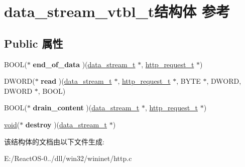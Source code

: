 \hypertarget{structdata__stream__vtbl__t}{}\section{data\+\_\+stream\+\_\+vtbl\+\_\+t结构体 参考}
\label{structdata__stream__vtbl__t}
\subsection*{Public 属性}
\begin{DoxyCompactItemize}
\item 
\mbox{\label{structdata__stream__vtbl__t_a87714ca484e6c808b1e661619e27b19b}} 
B\+O\+OL($\ast$ {\bfseries end\+\_\+of\+\_\+data} )(\hyperlink{structdata__stream__t}{data\+\_\+stream\+\_\+t} $\ast$, \hyperlink{structhttp__request__t}{http\+\_\+request\+\_\+t} $\ast$)
\item 
\mbox{\label{structdata__stream__vtbl__t_ac872be90e519d753513e3fe281972f1a}} 
D\+W\+O\+RD($\ast$ {\bfseries read} )(\hyperlink{structdata__stream__t}{data\+\_\+stream\+\_\+t} $\ast$, \hyperlink{structhttp__request__t}{http\+\_\+request\+\_\+t} $\ast$, B\+Y\+TE $\ast$, D\+W\+O\+RD, D\+W\+O\+RD $\ast$, B\+O\+OL)
\item 
\mbox{\label{structdata__stream__vtbl__t_a8a997f4f5ac2e257aa4a939e4c81aea8}} 
B\+O\+OL($\ast$ {\bfseries drain\+\_\+content} )(\hyperlink{structdata__stream__t}{data\+\_\+stream\+\_\+t} $\ast$, \hyperlink{structhttp__request__t}{http\+\_\+request\+\_\+t} $\ast$)
\item 
\mbox{\label{structdata__stream__vtbl__t_a949a1b3f22cb07b040cf6db0e44aad34}} 
\hyperlink{interfacevoid}{void}($\ast$ {\bfseries destroy} )(\hyperlink{structdata__stream__t}{data\+\_\+stream\+\_\+t} $\ast$)
\end{DoxyCompactItemize}


该结构体的文档由以下文件生成\+:\begin{DoxyCompactItemize}
\item 
E\+:/\+React\+O\+S-\/0../dll/win32/wininet/http.\+c\end{DoxyCompactItemize}
